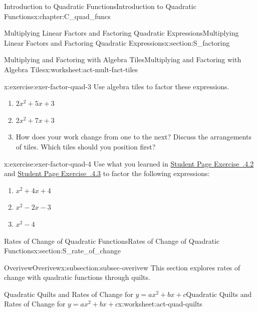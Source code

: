 \documentclass[oneside,10pt,]{book}
\newcommand{\xreffont}{\relax}
\numberwithin{equation}{chapter}
\begin{document}
\begin{chapterptx}{Introduction to Quadratic Functions}{}{Introduction to Quadratic Functions}{}{}{x:chapter:C_quad_funcs}
\begin{sectionptx}{Multiplying Linear Factors and Factoring Quadratic Expressions}{}{Multiplying Linear Factors and Factoring Quadratic Expressions}{}{}{x:section:S_factoring}
\begin{worksheet-subsection}{Multiplying and Factoring with Algebra Tiles}{}{Multiplying and Factoring with Algebra Tiles}{}{}{x:worksheet:act-mult-fact-tiles}
\begin{divisionexercise}{3}{}{}{x:exercise:exer-factor-quad-3}
Use algebra tiles to factor these expressions.%
\begin{enumerate}[font=\bfseries,label=(\alph*),ref=\alph*]
\item{}\(2x^2 + 5x + 3\)%
\item{}\(2x^2 + 7x + 3\)%
\item{}How does your work change from one to the next? Discuss the arrangements of tiles. Which tiles should you position first?%
\end{enumerate}
\end{divisionexercise}%
\begin{divisionexercise}{4}{}{}{x:exercise:exer-factor-quad-4}%
Use what you learned in \hyperlink{x:exercise:exer-factor-quad-2}{Student Page Exercise~{\xreffont 4.3.4.2}} and \hyperlink{x:exercise:exer-factor-quad-3}{Student Page Exercise~{\xreffont 4.3.4.3}} to factor the following expressions:%
\begin{enumerate}[font=\bfseries,label=(\alph*),ref=\alph*]
\item{}\(x^2 + 4x + 4\)%
\item{}\(x^2 - 2x - 3\)%
\item{}\(x^2 - 4\)%
\end{enumerate}
\end{divisionexercise}%
\end{worksheet-subsection}
\restoregeometry
\end{sectionptx}
%
%
\typeout{************************************************}
\typeout{************************************************}
%
\begin{sectionptx}{Rates of Change of Quadratic Functions}{}{Rates of Change of Quadratic Functions}{}{}{x:section:S_rate_of_change}
%
%
\typeout{************************************************}
\typeout{************************************************}
%
\begin{subsectionptx}{Overivew}{}{Overivew}{}{}{x:subsection:subsec-overivew}
This section explores rates of change with quadratic functions through quilts.%
\end{subsectionptx}
%
%
\typeout{************************************************}
\typeout{************************************************}
%
\begin{worksheet-subsection}{Quadratic Quilts and Rates of Change for \(y = ax^2 + bx + c\)}{}{Quadratic Quilts and Rates of Change for \(y = ax^2 + bx + c\)}{}{}{x:worksheet:act-quad-quilts}

\end{worksheet-subsection}
\end{sectionptx}
\end{chapterptx}
\end{document}
